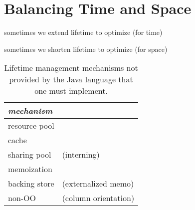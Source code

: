 \section{Balancing Time and Space}
\label{balance-time-and-space}

sometimes we extend lifetime to optimize (for time)

sometimes we shorten lifetime to optimize (for space)



\begin{table}
\centering
\begin{tabular}{|l|l|} \hline
\em mechanism & \\ \hline \hline
resource pool & \\ \hline
cache & \\ \hline
sharing pool & (interning)\\ \hline
memoization & \\ \hline
backing store &(externalized memo) \\ \hline
non-OO & (column orientation) \\ \hline 
\end{tabular}
\caption{Lifetime management mechanisms not provided by the Java language that one must implement.}
\label{tab:software-lifetime-management}
\end{table}
